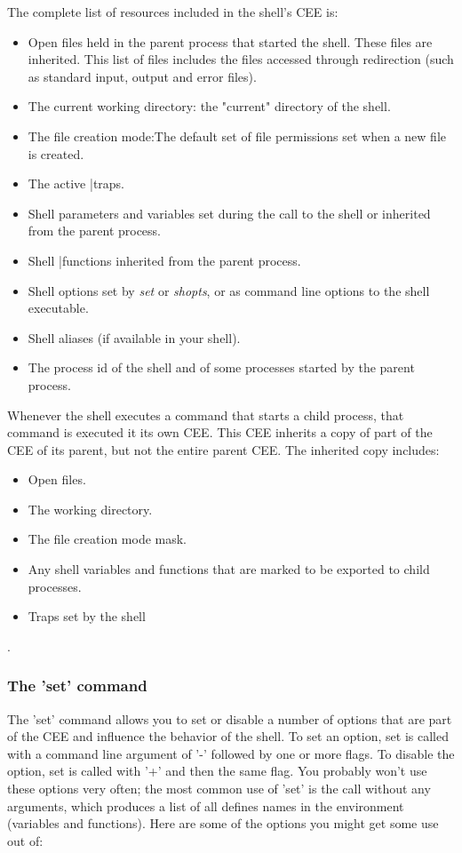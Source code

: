 The complete list of resources included in the shell's CEE is:
\begin{itemize}
\item Open files held in the parent process that started the shell. These files
are inherited. This list of files includes the files accessed through
redirection (such as standard input, output and error files).
\item The current working directory: the "current" directory of the shell.
\item The file creation mode:The default set of file permissions set when a new
file is created.
\item The active |traps.
\item Shell parameters and variables set during the call to the shell or
inherited from the parent process.
\item Shell |functions inherited from the parent process.
\item Shell options set by \textit{set} or \textit{shopts}, or as command line
options to the shell executable.
\item Shell aliases (if available in your shell).
\item The process id of the shell and of some processes started by the parent
process.
\end{itemize}

Whenever the shell executes a command that starts a child process, that command
is executed it its own CEE. This CEE inherits a copy of part of the CEE of its
parent, but not the entire parent CEE. The inherited copy includes:

\begin{itemize}
\item Open files.
\item The working directory.
\item The file creation mode mask.
\item Any shell variables and functions that are marked to be exported to child processes.
\item Traps set by the shell
\end{itemize}.

\subsubsection{The 'set' command}
The 'set' command allows you to set or disable a number of options that are
part of the CEE and influence the behavior of the shell. To set an option, set
is called with a command line argument of '-' followed by one or more flags. To
disable the option, set is called with '+' and then the same flag. You probably
won't use these options very often; the most common use of 'set' is the call
without any arguments, which produces a list of all defines names in the
environment (variables and functions). Here are some of the options you might
get some use out of:


